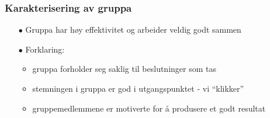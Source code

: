 \documentclass[screen]{beamer}
\begin{document}
\begin{frame}
  \frametitle{Karakterisering av gruppa}
  \begin{itemize}
    \item[$\bullet$] Gruppa har høy effektivitet og arbeider veldig godt sammen
    \item[$\bullet$] Forklaring:
      \begin{itemize}
	\item gruppa forholder seg saklig til beslutninger som tas
	\item stemningen i gruppa er god i utgangspunktet - vi ``klikker''
	\item gruppemedlemmene er motiverte for å produsere et godt resultat
      \end{itemize}
  \end{itemize}
\end{frame}
\end{document}
